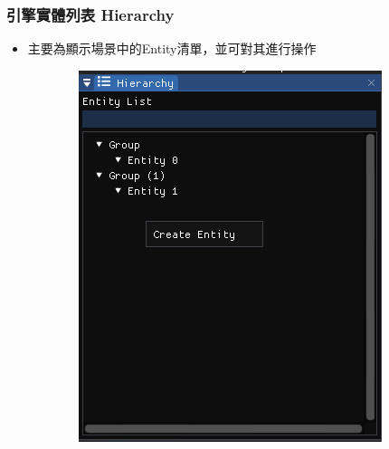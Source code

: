 \subsubsection{引擎實體列表 Hierarchy}

\begin{itemize}
\item{主要為顯示場景中的Entity清單，並可對其進行操作}
\end{itemize}

\begin{figure}
    \begin{subfigure}[b]{0.5\linewidth}
        \includegraphics[width=\linewidth]{./resources/editor/Hierarchy_a.png} 
    \end{subfigure}
    \begin{subfigure}[b]{0.5\linewidth}

\end{subfigure}
\end{figure}
